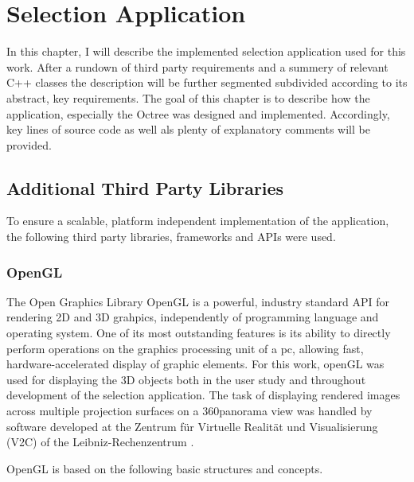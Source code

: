 \chapter{Selection Application}
\label{sec:selection_application}

In this chapter, I will describe the implemented selection application used for this work. After a rundown of third party requirements and a summery of relevant C++ classes the description will be further segmented subdivided according to its abstract, key requirements.
The goal of this chapter is to describe how the application, especially the Octree\cite{Octree} was designed and implemented. Accordingly, key lines of source code as well als plenty of explanatory comments will be provided.

\section{Additional Third Party Libraries}
\label{sec:additional_third_party_libraries}

To ensure a scalable, platform independent implementation of the application, the following third party libraries, frameworks and APIs were used.

\subsection{OpenGL}
\label{sec:opengl}

The Open Graphics Library OpenGL \cite{OpenGL} is a powerful, industry standard API for rendering 2D and 3D grahpics, independently of programming language and operating system. One of its most outstanding features is its ability to directly perform operations on the graphics processing unit of a pc, allowing fast, hardware-accelerated display of graphic elements. For this work, openGL was used for displaying the 3D objects both in the user study and throughout development of the selection application. The task of displaying rendered images across multiple projection surfaces on a 360\degree panorama view was handled by software developed at the Zentrum f\"ur Virtuelle Realit\"at und Visualisierung (V2C) of the Leibniz-Rechenzentrum \cite{v2c}.

OpenGL is based on the following basic structures and concepts.

